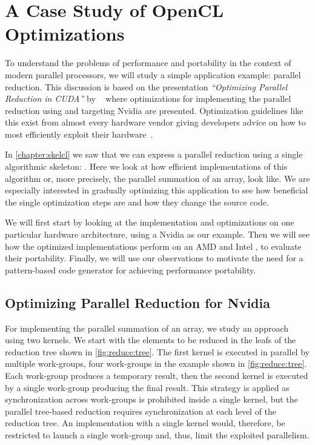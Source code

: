 \section{A Case Study of OpenCL Optimizations}
\label{sec:reduce:case-study}
\label{section:reduce:case-study}
To understand the problems of performance and portability in the context of modern parallel processors, we will study a simple application example: parallel reduction.
This discussion is based on the presentation \emph{``Optimizing Parallel Reduction in CUDA''} by \citeauthor{Harris2007}~\cite{Harris2007} where optimizations for implementing the parallel reduction using \CUDA and targeting Nvidia \GPUs are presented.
Optimization guidelines like this exist from almost every hardware vendor giving developers advice on how to most efficiently exploit their hardware~\cite{CUDAProgrammingGuide,AMDProgrammingGuide,IntelGPUProgrammingGuide,IntelXeonProgrammingGuide}.

In \autoref{chapter:skelcl} we saw that we can express a parallel reduction using a single algorithmic skeleton: \reduce.
Here we look at how efficient \OpenCL implementations of this algorithm or, more precisely, the parallel summation of an array, look like.
We are especially interested in gradually optimizing this application to see how beneficial the single optimization steps are and how they change the source code.

We will first start by looking at the implementation and optimizations on one particular hardware architecture, using a Nvidia \GPU as our example.
Then we will see how the optimized implementations perform on an AMD \GPU and Intel \CPU, to evaluate their portability.
Finally, we will use our observations to motivate the need for a pattern-based code generator for achieving performance portability.

\subsection{Optimizing Parallel Reduction for Nvidia \GPUs}
For implementing the parallel summation of an array, we study an approach using two \OpenCL kernels.
We start with the elements to be reduced in the leafs of the reduction tree shown in \autoref{fig:reduce:tree}.
The first \OpenCL kernel is executed in parallel by multiple \OpenCL work-groups, four work-groups in the example shown in \autoref{fig:reduce:tree}.
Each work-group produces a temporary result, then the second \OpenCL kernel is executed by a single \OpenCL work-group producing the final result.
This strategy is applied as synchronization across work-groups is prohibited inside a single \OpenCL kernel, but the parallel tree-based reduction requires synchronization at each level of the reduction tree.
An implementation with a single \OpenCL kernel would, therefore, be restricted to launch a single \OpenCL work-group and, thus, limit the exploited parallelism.

